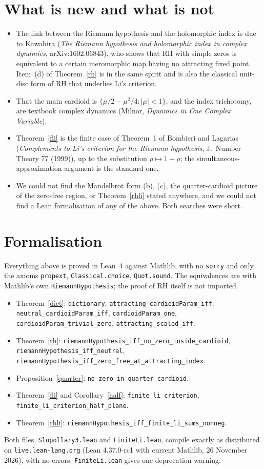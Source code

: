 \documentclass[11pt,a4paper]{article}
\theoremstyle{remark}\newtheorem*{remark}{Remark}
\begin{document}
\section{What is new and what is not}
\begin{itemize}[leftmargin=1.4em]
\item The link between the Riemann hypothesis and the holomorphic index is due to
Kawahira (\emph{The Riemann hypothesis and holomorphic index in complex dynamics},
arXiv:1602.06843), who shows that RH with simple
zeros is equivalent to a certain meromorphic map having no attracting fixed point.
Item~(d) of Theorem~\ref{rh} is in the same spirit and is also the classical unit-disc
form of RH that underlies Li's criterion.
\item That the main cardioid is $\{\mu/2-\mu^{2}/4:|\mu|<1\}$, and the index
trichotomy, are textbook complex dynamics (Milnor, \emph{Dynamics in One Complex
Variable}).
\item Theorem~\ref{fli} is the finite case of Theorem~1 of Bombieri and Lagarias
(\emph{Complements to Li's criterion for the Riemann hypothesis}, J.\ Number Theory 77
(1999)), up to the substitution $\rho\mapsto1-\rho$; the simultaneous-approximation
argument is the standard one.
\item We could not find the Mandelbrot form (b), (c), the quarter-cardioid picture of the
zero-free region, or Theorem~\ref{rhli} stated anywhere, and we could not find a Lean
formalisation of any of the above. Both searches were short.
\end{itemize}

\section{Formalisation}
Everything above is proved in Lean~4 against Mathlib, with no \texttt{sorry} and only
the axioms \texttt{propext}, \texttt{Classical.choice}, \texttt{Quot.sound}. The
equivalences are with Mathlib's own \texttt{RiemannHypothesis}; the proof of RH itself
is not imported.

\begin{itemize}[leftmargin=1.4em,itemsep=1pt]\small\raggedright
\item Theorem~\ref{dict}: \texttt{dictionary}, \texttt{attracting\_cardioidParam\_iff}, \texttt{neutral\_cardioidParam\_iff}, \texttt{cardioidParam\_one}, \texttt{cardioidParam\_trivial\_zero}, \texttt{attracting\_scaled\_iff}.
\item Theorem~\ref{rh}: \texttt{riemannHypothesis\_iff\_no\_zero\_inside\_cardioid}, \texttt{riemannHypothesis\_iff\_neutral}, \texttt{riemannHypothesis\_iff\_zero\_free\_at\_attracting\_index}.
\item Proposition~\ref{quarter}: \texttt{no\_zero\_in\_quarter\_cardioid}.
\item Theorem~\ref{fli} and Corollary~\ref{half}: \texttt{finite\_li\_criterion}, \texttt{finite\_li\_criterion\_half\_plane}.
\item Theorem~\ref{rhli}: \texttt{riemannHypothesis\_iff\_finite\_li\_sums\_nonneg}.
\end{itemize}

\medskip\noindent
Both files, \texttt{Slopollary3.lean} and \texttt{FiniteLi.lean}, compile exactly as distributed on \texttt{live.lean-lang.org} (Lean 4.37.0-rc1 with current Mathlib, 26 November 2026), with no errors. \texttt{FiniteLi.lean} gives one deprecation warning.
\end{document}
